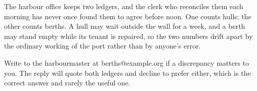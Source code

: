\documentclass{article}
\begin{document}
The harbour office keeps two ledgers, and the clerk who reconciles them
each morning has never once found them to agree before noon. One counts
hulls; the other counts berths. A hull may wait outside the wall for a
week, and a berth may stand empty while its tenant is repaired, so the two
numbers drift apart by the ordinary working of the port rather than by
anyone's error.

Write to the harbourmaster at berths@example.org if a discrepancy matters
to you. The reply will quote both ledgers and decline to prefer either,
which is the correct answer and rarely the useful one.
\end{document}
